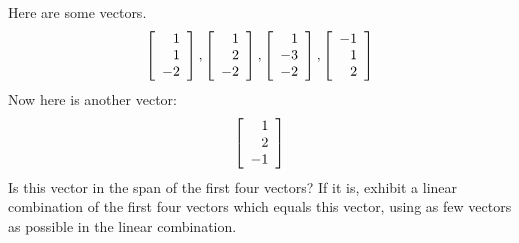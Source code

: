 \begin{enumialphparenastyle}
\begin{ex} Here are some vectors. 
\begin{equation*}
\left[ 
\begin{array}{r}
1 \\ 
1 \\ 
-2
\end{array}
\right] ,\left[ 
\begin{array}{r}
1 \\ 
2 \\ 
-2
\end{array}
\right] ,\left[ 
\begin{array}{r}
1 \\ 
-3 \\ 
-2
\end{array}
\right] ,\left[ 
\begin{array}{r}
-1 \\ 
1 \\ 
2
\end{array}
\right]
\end{equation*}
Now here is another vector:\ 
\begin{equation*}
\left[ 
\begin{array}{r}
1 \\ 
2 \\ 
-1
\end{array}
\right] 
\end{equation*}
Is this vector in the span of the first four vectors? If it is, exhibit a
linear combination of the first four vectors which equals this vector, using
as few vectors as possible in the linear combination.
\end{ex}


\end{enumialphparenastyle}
